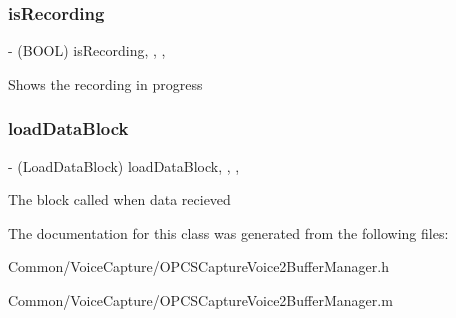 \subsubsection{\texorpdfstring{is\+Recording}{isRecording}}
{\footnotesize\ttfamily -\/ (B\+O\+OL) is\+Recording\hspace{0.3cm}{\ttfamily [read]}, {\ttfamily [write]}, {\ttfamily [nonatomic]}, {\ttfamily [assign]}}

Shows the recording in progress \hypertarget{interface_o_p_c_s_capture_voice2_buffer_manager_a066b33fce715f27ea53a4c2f508e4457}{}\label{interface_o_p_c_s_capture_voice2_buffer_manager_a066b33fce715f27ea53a4c2f508e4457} 
\subsubsection{\texorpdfstring{load\+Data\+Block}{loadDataBlock}}
{\footnotesize\ttfamily -\/ (Load\+Data\+Block) load\+Data\+Block\hspace{0.3cm}{\ttfamily [read]}, {\ttfamily [write]}, {\ttfamily [nonatomic]}, {\ttfamily [copy]}}

The block called when data recieved 

The documentation for this class was generated from the following files\+:\begin{DoxyCompactItemize}
\item 
Common/\+Voice\+Capture/O\+P\+C\+S\+Capture\+Voice2\+Buffer\+Manager.\+h\item 
Common/\+Voice\+Capture/O\+P\+C\+S\+Capture\+Voice2\+Buffer\+Manager.\+m\end{DoxyCompactItemize}
